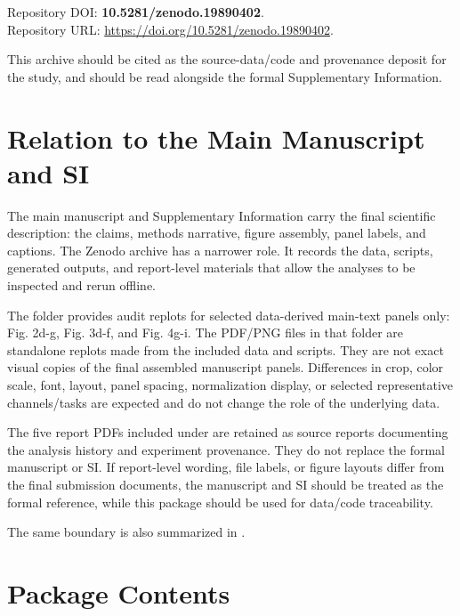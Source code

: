 \documentclass[11pt]{article}
\begin{document}
Repository DOI: \textbf{10.5281/zenodo.19890402}.\\
Repository URL: \url{https://doi.org/10.5281/zenodo.19890402}.

This archive should be cited as the source-data/code and provenance deposit for
the study, and should be read alongside the formal Supplementary Information.

\section*{Relation to the Main Manuscript and SI}

The main manuscript and Supplementary Information carry the final scientific
description: the claims, methods narrative, figure assembly, panel labels, and
captions. The Zenodo archive has a narrower role. It records the data, scripts,
generated outputs, and report-level materials that allow the analyses to be
inspected and rerun offline.

The folder  provides audit replots for selected
data-derived main-text panels only: Fig. 2d-g, Fig. 3d-f, and Fig. 4g-i. The
PDF/PNG files in that folder are standalone replots made from the included data
and scripts. They are not exact visual copies of the final assembled manuscript
panels. Differences in crop, color scale, font, layout, panel spacing,
normalization display, or selected representative channels/tasks are expected
and do not change the role of the underlying data.

The five report PDFs included under  are retained as source
reports documenting the analysis history and experiment provenance. They do not
replace the formal manuscript or SI. If report-level wording, file labels, or
figure layouts differ from the final submission documents, the manuscript and
SI should be treated as the formal reference, while this package should be used
for data/code traceability.

The same boundary is also summarized in
.

\section*{Package Contents}
\end{document}
